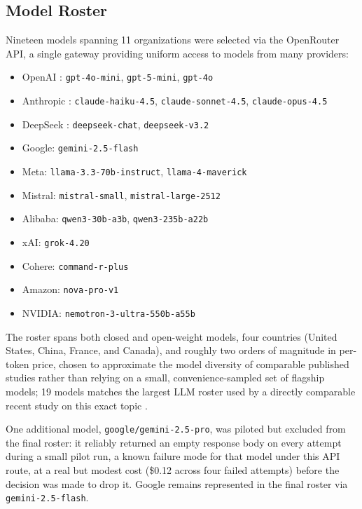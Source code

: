 \documentclass[11pt]{article}
\begin{document}
\subsection{Model Roster}
\label{si:model-roster}

Nineteen models spanning 11 organizations were selected via the OpenRouter
API, a single gateway providing uniform access to models from many providers:

\begin{itemize}[nosep, leftmargin=1.5em]
  \item[] OpenAI \citep{openai2023}: \texttt{gpt-4o-mini}, \texttt{gpt-5-mini}, \texttt{gpt-4o}
  \item[] Anthropic \citep{anthropic2023}: \texttt{claude-haiku-4.5}, \texttt{claude-sonnet-4.5}, \texttt{claude-opus-4.5}
  \item[] DeepSeek \citep{deepseek2025}: \texttt{deepseek-chat}, \texttt{deepseek-v3.2}
  \item[] Google: \texttt{gemini-2.5-flash}
  \item[] Meta: \texttt{llama-3.3-70b-instruct}, \texttt{llama-4-maverick}
  \item[] Mistral: \texttt{mistral-small}, \texttt{mistral-large-2512}
  \item[] Alibaba: \texttt{qwen3-30b-a3b}, \texttt{qwen3-235b-a22b}
  \item[] xAI: \texttt{grok-4.20}
  \item[] Cohere: \texttt{command-r-plus}
  \item[] Amazon: \texttt{nova-pro-v1}
  \item[] NVIDIA: \texttt{nemotron-3-ultra-550b-a55b}
\end{itemize}

The roster spans both closed and open-weight models, four countries (United
States, China, France, and Canada), and roughly two orders of magnitude in
per-token price, chosen to approximate the model diversity of comparable
published studies rather than relying on a small, convenience-sampled set of
flagship models; 19 models matches the largest LLM roster used by a directly
comparable recent study on this exact topic \citep{buyl2026}.

One additional model, \texttt{google/gemini-2.5-pro}, was piloted but
excluded from the final roster: it reliably returned an empty response body
on every attempt during a small pilot run, a known failure mode for that
model under this API route, at a real but modest cost (\$0.12 across four
failed attempts) before the decision was made to drop it. Google remains
represented in the final roster via \texttt{gemini-2.5-flash}.
\end{document}
